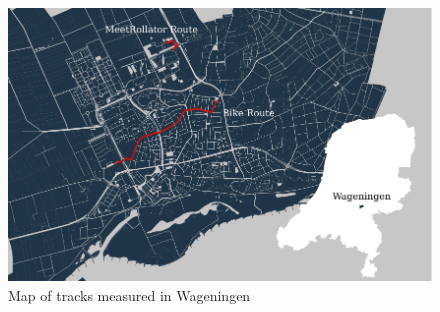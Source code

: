 \begin{figure}[ht]
\includegraphics[width=\textwidth]{img/M_overviewRoute.pdf}
\centering
\caption{ Map of tracks measured in Wageningen\label{tracks}}
\end{figure}

